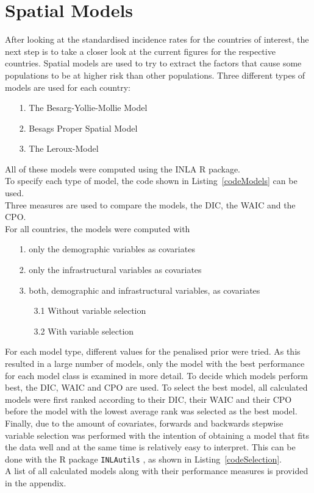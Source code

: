 \section{Spatial Models}
After looking at the standardised incidence rates for the countries of interest, the next step is to take a closer look at the current figures for the respective countries. Spatial models are used to try to extract the factors that cause some populations to be at higher risk than other populations. Three different types of models are used for each country:
\begin{itemize}
    \item[1.] The Besarg-Yollie-Mollie Model
    \item[2.] Besags Proper Spatial Model
    \item[3.] The Leroux-Model
\end{itemize}
All of these models were computed using the INLA \cite{rinla} R package. \\
To specify each type of model, the code shown in Listing~\ref{codeModels} can be used. \\
Three measures are used to compare the models, the DIC, the WAIC and the CPO. \\
For all countries, the models were computed with
\begin{itemize}
    \item[1.] only the demographic variables as covariates
    \item[2.] only the infrastructural variables as covariates
    \item[3.] both, demographic and infrastructural variables, as covariates
    \begin{itemize}
        \item[3.1] Without variable selection
        \item[3.2] With variable selection
    \end{itemize}
\end{itemize}
For each model type, different values for the penalised prior were tried. As this resulted in a large number of models, only the model with the best performance for each model class is examined in more detail. To decide which models perform best, the DIC, WAIC and CPO are used. To select the best model, all calculated models were first ranked according to their DIC, their WAIC and their CPO before the model with the lowest average rank was selected as the best model. \\
Finally, due to the amount of covariates, forwards and backwards stepwise variable selection was performed with the intention of obtaining a model that fits the data well and at the same time is relatively easy to interpret. This can be done with the R package \texttt{INLAutils} \cite{inlautils}, as shown in Listing~\ref{codeSelection}. \\
A list of all calculated models along with their performance measures is provided in the appendix.
